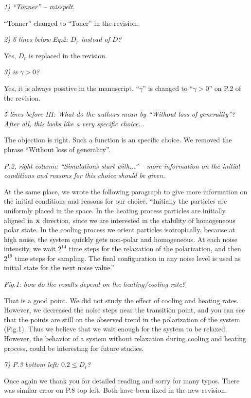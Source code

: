 \documentclass[a4paper,11pt]{letter}
\newcommand{\rf}[1]{\textit{\textcolor{hlcolor}{#1}}}
\begin{document}
\rf{1) ``Tonner'' -- misspelt.}

``Tonner'' changed to ``Toner'' in the revision.

\rf{2) 6 lines below Eq.2: $D_r$ instead of $D$?}

Yes, $D_r$ is replaced in the revision.

\rf{3) is $\gamma>0$?}

Yes, it is always positive in the manuscript. ``$\gamma$'' is changed to ``$\gamma>0$'' on P.2 of the revision.

\rf{5 lines before III: What do the authors mean by ``Without loss of generality''? After all, this looks like a very specific choice...}

The objection is right. Such a function is an specific choice. We removed the phrase ``Without loss of generality''.

\rf{P.2, right column: ``Simulations start with...'' -- more information on the initial conditions and reasons for this choice should be given.}

At the same place, we wrote the following paragraph to give more information on the initial conditions and reasons for our choice. ``Initially the particles are uniformly placed in the space. In the heating process particles are initially aligned in $\rm \bf x$ direction, since we are interested in the stability of homogeneous polar state. In the cooling process we orient particles isotropically, because at high noise, the system quickly gets non-polar and homogeneous. At each noise intensity, we wait $2^{14}$ time steps for the relaxation of the polarization, and then $2^{19}$ time steps for sampling. The final configuration in any noise level is used as initial state for the next noise value.''

\rf{Fig.1: how do the results depend on the heating/cooling rate?}

That is a good point. We did not study the effect of cooling and heating rates. However, we decreased the noise steps near the transition point, and you can see that the points are still on the observed trend in the polarization of the system (Fig.1). Thus we believe that we wait enough for the system to be relaxed. However, the behavior of a system without relaxation during cooling and heating process, could be interesting for future studies.

\rf{7) P.3 bottom left: $0.2 \leq D_r$?}

Once again we thank you for detailed reading and sorry for many typos. There was similar error on P.8 top left. Both have been fixed in the new revision.
\end{document}
